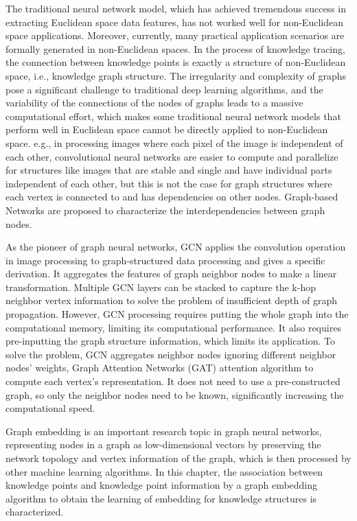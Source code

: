 
The traditional neural network model, which has achieved tremendous success in extracting Euclidean space data features, has not worked well for non-Euclidean space applications. Moreover, currently, many practical application scenarios are formally generated in non-Euclidean spaces. In the process of knowledge tracing, the connection between knowledge points is exactly a structure of non-Euclidean space, i.e., knowledge graph structure. The irregularity and complexity of graphs pose a significant challenge to traditional deep learning algorithms, and the variability of the connections of the nodes of graphs leads to a massive computational effort, which makes some traditional neural network models that perform well in Euclidean space cannot be directly applied to non-Euclidean space. e.g., in processing images where each pixel of the image is independent of each other, convolutional neural networks are easier to compute and parallelize for structures like images that are stable and single and have individual parts independent of each other, but this is not the case for graph structures where each vertex is connected to and has dependencies on other nodes. Graph-based Networks are proposed to characterize the interdependencies between graph nodes.

As the pioneer of graph neural networks, GCN applies the convolution operation in image processing to graph-structured data processing and gives a specific derivation. It aggregates the features of graph neighbor nodes to make a linear transformation. Multiple GCN layers can be stacked to capture the k-hop neighbor vertex information to solve the problem of insufficient depth of graph propagation. However, GCN processing requires putting the whole graph into the computational memory, limiting its computational performance. It also requires pre-inputting the graph structure information, which limits its application. To solve the problem, GCN aggregates neighbor nodes ignoring different neighbor nodes' weights, Graph Attention Networks (GAT) attention algorithm to compute each vertex's representation. It does not need to use a pre-constructed graph, so only the neighbor nodes need to be known, significantly increasing the computational speed.

Graph embedding is an important research topic in graph neural networks, representing nodes in a graph as low-dimensional vectors by preserving the network topology and vertex information of the graph, which is then processed by other machine learning algorithms. In this chapter, the association between knowledge points and knowledge point information by a graph embedding algorithm to obtain the learning of embedding for knowledge structures is characterized.

